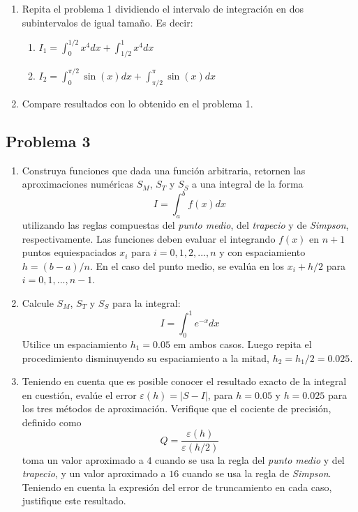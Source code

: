 \documentclass[11pt]{article}
\begin{document}
\begin{enumerate}
\def\labelenumi{\arabic{enumi}.}
\item
  Repita el problema 1 dividiendo el intervalo de integración en dos
  subintervalos de igual tamaño. Es decir:

  \begin{enumerate}
  \def\labelenumii{\alph{enumii}.}
  \item
    \(I_1=\int_0^{1/2} x^4 dx+ \int_{1/2}^1 x^4 dx\)
  \item
    \(I_2=\int_0^{\pi/2}\sin{(x)}dx+\int_{\pi/2}^{\pi}\sin{(x)} dx\)
  \end{enumerate}
\item
  Compare resultados con lo obtenido en el problema 1.
\end{enumerate}

    \hypertarget{problema-3}{%
\subsection{Problema 3}\label{problema-3}}

\begin{enumerate}
\def\labelenumi{\arabic{enumi}.}
\item
  Construya funciones que dada una función arbitraria, retornen las
  aproximaciones numéricas \(S_M\), \(S_T\) y \(S_S\) a una integral de
  la forma \[
  I = \int_a ^b f(x) dx
  \] utilizando las reglas compuestas del \emph{punto medio}, del
  \emph{trapecio} y de \emph{Simpson}, respectivamente. Las funciones
  deben evaluar el integrando \(f(x)\) en \(n+1\) puntos equiespaciados
  \(x_i\) para \(i=0,1,2,...,n\) y con espaciamiento \(h=(b-a)/n\). En
  el caso del punto medio, se evalúa en los \(x_i+h/2\) para
  \(i=0,1,...,n-1\).
\item
  Calcule \(S_M\), \(S_T\) y \(S_S\) para la integral: \[
  I = \int _0 ^1 e^{-x} dx
  \] Utilice un espaciamiento \(h_1=0.05\) em ambos casos. Luego repita
  el procedimiento disminuyendo su espaciamiento a la mitad,
  \(h_2=h_1/2=0.025\).
\item
  Teniendo en cuenta que es posible conocer el resultado exacto de la
  integral en cuestión, evalúe el error \(\varepsilon(h)=|S-I|\), para
  \(h=0.05\) y \(h=0.025\) para los tres métodos de aproximación.
  Verifique que el cociente de precisión, definido como \[
  Q = \frac{\varepsilon(h)}{\varepsilon(h/2)}
  \] toma un valor aproximado a \(4\) cuando se usa la regla del
  \emph{punto medio} y del \emph{trapecio}, y un valor aproximado a
  \(16\) cuando se usa la regla de \emph{Simpson}. Teniendo en cuenta la
  expresión del error de truncamiento en cada caso, justifique este
  resultado.
\end{enumerate}
\end{document}

